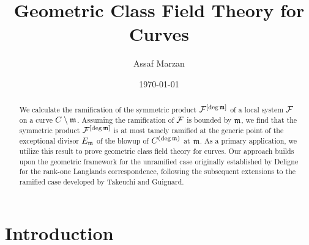 \documentclass[11pt]{report}
\begin{document}
\title{Geometric Class Field Theory for Curves}
\author{Assaf Marzan}
\date{\today}
\maketitle
\begin{abstract}
We calculate the ramification of the symmetric product $\mathcal{F}^{[\deg \mathfrak{m}]}$ of a local system $\mathcal{F}$ on a curve $C \setminus \mathfrak{m}$. 
Assuming the ramification of $\mathcal{F}$ is bounded by $\mathfrak{m}$, we find that the symmetric product $\mathcal{F}^{[\deg \mathfrak{m}]}$ is at most tamely ramified at the generic point of 
the exceptional divisor $E_{\mathfrak{m}}$ of the blowup of $C^{(\deg \mathfrak{m})}$ at $\mathfrak{m}$. As a primary application, 
we utilize this result to prove geometric class field theory for curves. Our approach builds upon the geometric framework for the unramified case originally established by Deligne for the rank-one Langlands correspondence, 
following the subsequent extensions to the ramified case developed by Takeuchi and Guignard.
\end{abstract}

\newpage
\tableofcontents
\newpage
\chapter*{Introduction}









\begin{appendices}


% 
\end{appendices}
\printbibliography
\end{document}
